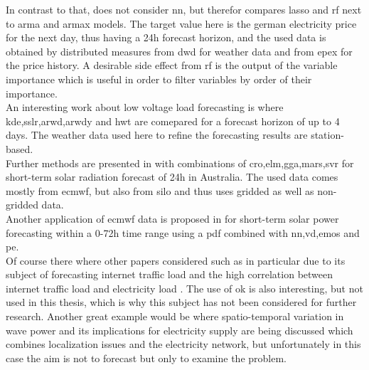 In contrast to that,  does not consider \gls{nn}, but therefor compares \gls{lasso} and \gls{rf} next to \gls{arma} and \gls{armax} models. The target value here is the german electricity price for the next day, thus having a 24h forecast horizon, and the used data is obtained by distributed measures from \gls{dwd} for weather data and from \gls{epex} for the price history. A desirable side effect from \gls{rf} is the output of the variable importance which is useful in order to filter variables by order of their importance.\\
An interesting work about low voltage load forecasting is  where \gls{kde},\gls{sslr},\gls{arwd},\gls{arwdy} and \gls{hwt} are comepared for a forecast horizon of up to 4 days. The weather data used here to refine the forecasting results are station-based.\\
Further methods are presented in  with combinations of \gls{cro},\gls{elm},\gls{gga},\gls{mars},\gls{svr} for short-term solar radiation forecast of 24h in Australia. The used data comes mostly from \gls{ecmwf}, but also from \gls{silo} and thus uses gridded as well as non-gridded data.\\
Another application of \gls{ecmwf} data is proposed in  for short-term solar power forecasting within a 0-72h time range using a \gls{pdf} combined with \gls{nn},\gls{vd},\gls{emos} and \gls{pe}.\\

Of course there where other papers considered such as  in particular due to its subject of forecasting internet traffic load and the high correlation between internet traffic load and electricity load \Parencite{Morley2018}. The use of \gls{ok} is also interesting, but not used in this thesis, which is why this subject has not been considered for further research. Another great example would be  where spatio-temporal variation in wave power and its implications for electricity supply are being discussed which combines localization issues and the electricity network, but unfortunately in this case the aim is not to forecast but only to examine the problem.\\

